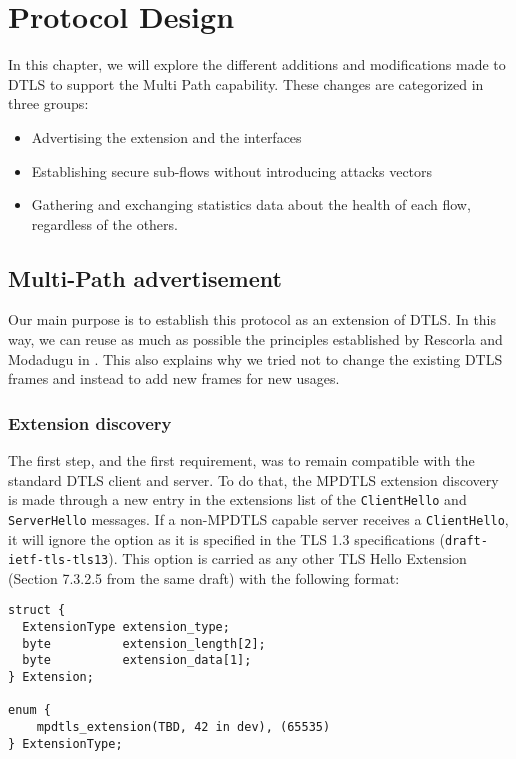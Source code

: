 \chapter{Protocol Design}\label{chap:design}

In this chapter, we will explore the different additions and modifications made to DTLS to support the Multi Path capability. These changes are categorized in three groups:
\begin{itemize}
\item Advertising the extension and the interfaces
\item Establishing secure sub-flows without introducing attacks vectors
\item Gathering and exchanging statistics data about the health of each flow, regardless of the others. 
\end{itemize}


\section{Multi-Path advertisement}

Our main purpose is to establish this protocol as an extension of DTLS. In this way, we can reuse as much as possible the principles established by Rescorla and Modadugu in \cite{modadugu2004design}. This also explains why we tried not to change the existing DTLS frames and instead to add new frames for new usages.

\subsection{Extension discovery}

The first step, and the first requirement, was to remain compatible with the standard DTLS client and server. To do that, the MPDTLS extension discovery is made through a new entry in the extensions list of the \texttt{ClientHello} and \texttt{ServerHello} messages. If a non-MPDTLS capable server receives a \texttt{ClientHello}, it will ignore the option  as it is specified in the TLS 1.3 specifications (\texttt{draft-ietf-tls-tls13}\cite{draft-tls13}). This option is carried as any other TLS Hello Extension (Section 7.3.2.5 from the same draft) with the following format:

\begin{lstlisting}[caption=MultiPath DTLS Extension structure, label=lst:extension]
struct {
  ExtensionType extension_type;
  byte          extension_length[2];
  byte          extension_data[1];
} Extension;

enum {
    mpdtls_extension(TBD, 42 in dev), (65535)
} ExtensionType;
\end{lstlisting}

